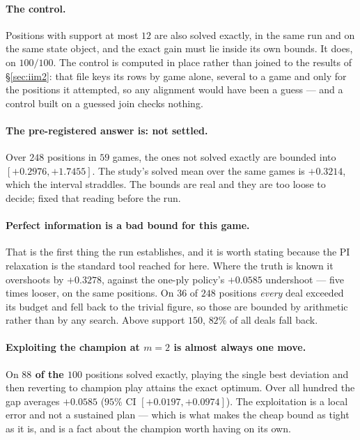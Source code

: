 \documentclass[11pt,a4paper]{article}
\begin{document}
\paragraph{The control.} Positions with support at most $12$ are also solved
exactly, in the same run and on the same state object, and the exact gain must
lie inside its own bounds. It does, on \textbf{$100/100$}. The control is
computed in place rather than joined to the results of \S\ref{sec:iim2}: that
file keys its rows by game alone, several to a game and only for the positions
it attempted, so any alignment would have been a guess --- and a control built
on a guessed join checks nothing.

\paragraph{The pre-registered answer is: not settled.} Over $248$ positions in
$59$ games, the ones not solved exactly are bounded into
$[\mathbf{+0.2976}, \mathbf{+1.7455}]$. The study's solved mean over the same
games is $+0.3214$, which the interval straddles. The bounds are real and they
are too loose to decide;  fixed that reading
before the run.

\paragraph{Perfect information is a bad bound for this game.} That is the
first thing the run establishes, and it is worth stating because the PI
relaxation is the standard tool reached for here. Where the truth is known it
overshoots by $+0.3278$, against the one-ply policy's $+0.0585$ undershoot ---
five times looser, on the same positions. On $36$ of $248$ positions
\emph{every} deal exceeded its budget and fell back to the trivial figure, so
those are bounded by arithmetic rather than by any search. Above support
$150$, $82\%$ of all deals fall back.

\paragraph{Exploiting the champion at $m = 2$ is almost always one move.}
On \textbf{$88$ of the $100$} positions solved exactly, playing the single best
deviation and then reverting to champion play attains the exact optimum. Over
all hundred the gap averages $+0.0585$ ($95\%$ CI $[+0.0197, +0.0974]$). The
exploitation is a local error and not a sustained plan --- which is what makes
the cheap bound as tight as it is, and is a fact about the champion worth
having on its own.
\end{document}
